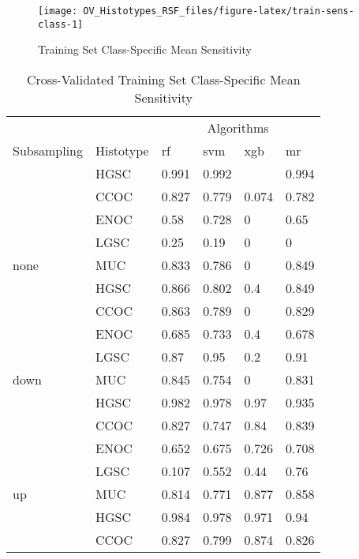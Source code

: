 \documentclass[
]{report}
\begin{document}
\begin{figure}[H]

{\centering \texttt{[image: OV\_Histotypes\_RSF\_files/figure-latex/train-sens-class-1]} 

}

\caption{Training Set Class-Specific Mean Sensitivity}\label{fig:train-sens-class}
\end{figure}

\begin{table}

\caption{\label{tab:train-sens-class-table}Cross-Validated Training Set Class-Specific Mean Sensitivity}
\centering
\begin{tabular}[t]{l|l|l|l|l|l}
\hline
\multicolumn{2}{c|}{ } & \multicolumn{4}{c}{Algorithms} \\
\cline{3-6}
Subsampling & Histotype & rf & svm & xgb & mr\\
\hline
 & HGSC & 0.991 & 0.992 & \cellcolor[HTML]{90ee90}{1} & 0.994\\
\cline{2-6}
 & CCOC & 0.827 & 0.779 & 0.074 & 0.782\\
\cline{2-6}
 & ENOC & 0.58 & 0.728 & 0 & 0.65\\
\cline{2-6}
 & LGSC & 0.25 & 0.19 & 0 & 0\\
\cline{2-6}
\multirow{-5}{*}{\raggedright\arraybackslash none} & MUC & 0.833 & 0.786 & 0 & 0.849\\
\cline{1-6}
 & HGSC & 0.866 & 0.802 & 0.4 & 0.849\\
\cline{2-6}
 & CCOC & 0.863 & 0.789 & 0 & 0.829\\
\cline{2-6}
 & ENOC & 0.685 & 0.733 & 0.4 & 0.678\\
\cline{2-6}
 & LGSC & 0.87 & 0.95 & 0.2 & 0.91\\
\cline{2-6}
\multirow{-5}{*}{\raggedright\arraybackslash down} & MUC & 0.845 & 0.754 & 0 & 0.831\\
\cline{1-6}
 & HGSC & 0.982 & 0.978 & 0.97 & 0.935\\
\cline{2-6}
 & CCOC & 0.827 & 0.747 & 0.84 & 0.839\\
\cline{2-6}
 & ENOC & 0.652 & 0.675 & 0.726 & 0.708\\
\cline{2-6}
 & LGSC & 0.107 & 0.552 & 0.44 & 0.76\\
\cline{2-6}
\multirow{-5}{*}{\raggedright\arraybackslash up} & MUC & 0.814 & 0.771 & 0.877 & 0.858\\
\cline{1-6}
 & HGSC & 0.984 & 0.978 & 0.971 & 0.94\\
\cline{2-6}
 & CCOC & 0.827 & 0.799 & 0.874 & 0.826\\

\end{tabular}
\end{table}
\end{document}
